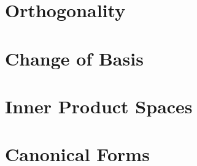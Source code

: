   \chapter{Orthogonality}\label{chap:8}
	
 	
	
	
	
	
         
	
	
	
        
        

\chapter{Change of Basis}\label{chap:9}
        
	
	
	

 \chapter{Inner Product Spaces}\label{chap:10}
	
	
	
	
 	

\chapter{Canonical Forms}\label{chap:11}
	
	
	

